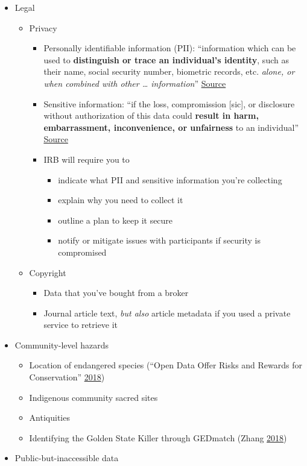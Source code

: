 \documentclass[
]{article}
\providecommand{\tightlist}{%
  \setlength{\itemsep}{0pt}\setlength{\parskip}{0pt}}
\begin{document}
\begin{itemize}
\tightlist
\item
  Legal

  \begin{itemize}
  \tightlist
  \item
    Privacy

    \begin{itemize}
    \tightlist
    \item
      Personally identifiable information (PII): ``information which can be used to \textbf{distinguish or trace an individual's identity}, such as their name, social security number, biometric records, etc. \emph{alone, or when combined with other \ldots{} information}'' \href{https://www.osec.doc.gov/opog/privacy/PII_BII.html}{Source}
    \item
      Sensitive information: ``if the loss, compromission {[}sic{]}, or disclosure without authorization of this data could \textbf{result in harm, embarrassment, inconvenience, or unfairness} to an individual'' \href{https://techgdpr.com/blog/difference-between-pii-and-personal-data/}{Source}
    \item
      IRB will require you to

      \begin{itemize}
      \tightlist
      \item
        indicate what PII and sensitive information you're collecting
      \item
        explain why you need to collect it
      \item
        outline a plan to keep it secure
      \item
        notify or mitigate issues with participants if security is compromised
      \end{itemize}
    \end{itemize}
  \item
    Copyright

    \begin{itemize}
    \tightlist
    \item
      Data that you've bought from a broker
    \item
      Journal article text, \emph{but also} article metadata if you used a private service to retrieve it
    \end{itemize}
  \end{itemize}
\item
  Community-level hazards

  \begin{itemize}
  \tightlist
  \item
    Location of endangered species (``Open Data Offer Risks and Rewards for Conservation'' \protect\hyperlink{ref-OpenDataOffer2018}{2018})
  \item
    Indigenous community sacred sites
  \item
    Antiquities
  \item
    Identifying the Golden State Killer through GEDmatch (Zhang \protect\hyperlink{ref-ZhangHowTinyWebsite2018}{2018})
  \end{itemize}
\item
  Public-but-inaccessible data


\end{itemize}
\end{document}
